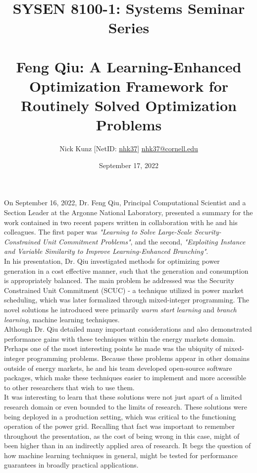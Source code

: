 \documentclass[11pt]{article}
\begin{document}
\title{SYSEN 8100-1: Systems Seminar Series\\~\\
    \Large Feng Qiu: A Learning-Enhanced Optimization Framework for Routinely Solved Optimization Problems
}
\author{
    Nick Kunz [NetID: \url{nhk37}] \hyperlink{nhk37@cornell.edu}{nhk37@cornell.edu}
}
\date{September 17, 2022}
\maketitle

On September 16, 2022, Dr. Feng Qiu, Principal Computational Scientist and a Section Leader at the Argonne National Laboratory, presented a summary for the work contained in two recent papers written in collaboration with he and his colleagues. The first paper was \textit{"Learning to Solve Large-Scale Security-Constrained Unit Commitment Problems"}, and the second, \textit{"Exploiting Instance and Variable Similarity to Improve Learning-Enhanced Branching"}.\\

In his presentation, Dr. Qiu investigated methods for optimizing power generation in a cost effective manner, such that the generation and consumption is appropriately balanced. The main problem he addressed was the Security Constrained Unit Commitment (SCUC) - a technique utilized in power market scheduling, which was later formalized through mixed-integer programming. The novel solutions he introduced were primarily \textit{warm start learning} and \textit{branch learning}, machine learning techniques. \\

Although Dr. Qiu detailed many important considerations and also demonstrated performance gains with these techniques within the energy markets domain. Perhaps one of the most interesting points he made was the ubiquity of mixed-integer programming problems. Because these problems appear in other domains outside of energy markets, he and his team developed open-source software packages, which make these techniques easier to implement and more accessible to other researchers that wish to use them. \\

It was interesting to learn that these solutions were not just apart of a limited research domain or even bounded to the limits of research. These solutions were being deployed in a production setting, which was critical to the functioning operation of the power grid. Recalling that fact was important to remember throughout the presentation, as the cost of being wrong in this case, might of been higher than in an indirectly applied area of research. It begs the question of how machine learning techniques in general, might be tested for performance guarantees in broadly practical applications.
\end{document}
